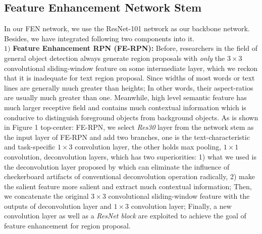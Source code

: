 \documentclass[letterpaper]{article}
\begin{document}
\subsection{Feature Enhancement Network Stem}
In our FEN network, we use the ResNet-101 \cite{he2016deep} network as our backbone network. Besides, we have integrated following two components into it.\\
$1)$ \textbf{Feature Enhancement RPN (FE-RPN):}
Before, researchers in the field of general object detection always generate region proposals with \textit{only} the $3\times 3$ convolutional sliding-window feature on some intermediate layer, which we reckon that it is inadequate for text region proposal. Since widths of most words or text lines are generally much greater than heights; In other words, their aspect-ratios are usually much greater than one. Meanwhile, high level semantic feature has much larger receptive field and contains much contextual information which is conducive to distinguish foreground objects from background objects. As is shown in Figure 1 top-center: FE-RPN, we select \textit{Res30} layer from the network stem as the input layer of FE-RPN and add two branches, one is the text-characteristic and task-specific $1\times 3$ convolution layer, the other holds max pooling, $1\times 1$ convolution, deconvolution layers, which has two superiorities: 1) what we used is the deconvolution layer proposed by \cite{odena2016deconvolution} which can eliminate the influence of checkerboard artifacts of conventional deconvolution operation radically, 2) make the salient feature more salient and extract much contextual information; Then, we concatenate the original $3\times 3$ convolutional sliding-window feature with the outputs of deconvolution layer and $1\times 3$ convolution layer; Finally, a new convolution layer as well as a \textit{ResNet block} are exploited to achieve the goal of feature enhancement for region proposal.
 \\
 \\
\end{document}
